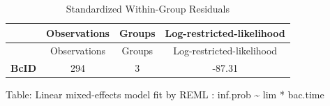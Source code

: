 \documentclass[]{article}
\begin{document}
\begin{longtable}[]{@{}cccc@{}}
\caption{Standardized Within-Group Residuals}\tabularnewline
\toprule
\begin{minipage}[b]{0.14\columnwidth}\centering\strut
~\strut
\end{minipage} & \begin{minipage}[b]{0.18\columnwidth}\centering\strut
Observations\strut
\end{minipage} & \begin{minipage}[b]{0.11\columnwidth}\centering\strut
Groups\strut
\end{minipage} & \begin{minipage}[b]{0.33\columnwidth}\centering\strut
Log-restricted-likelihood\strut
\end{minipage}\tabularnewline
\midrule
\endfirsthead
\toprule
\begin{minipage}[b]{0.14\columnwidth}\centering\strut
~\strut
\end{minipage} & \begin{minipage}[b]{0.18\columnwidth}\centering\strut
Observations\strut
\end{minipage} & \begin{minipage}[b]{0.11\columnwidth}\centering\strut
Groups\strut
\end{minipage} & \begin{minipage}[b]{0.33\columnwidth}\centering\strut
Log-restricted-likelihood\strut
\end{minipage}\tabularnewline
\midrule
\endhead
\begin{minipage}[t]{0.14\columnwidth}\centering\strut
\textbf{BcID}\strut
\end{minipage} & \begin{minipage}[t]{0.18\columnwidth}\centering\strut
294\strut
\end{minipage} & \begin{minipage}[t]{0.11\columnwidth}\centering\strut
3\strut
\end{minipage} & \begin{minipage}[t]{0.33\columnwidth}\centering\strut
-87.31\strut
\end{minipage}\tabularnewline
\bottomrule
\end{longtable}

Table: Linear mixed-effects model fit by REML : inf.prob
\textasciitilde{} lim * bac.time

\newpage
\end{document}
